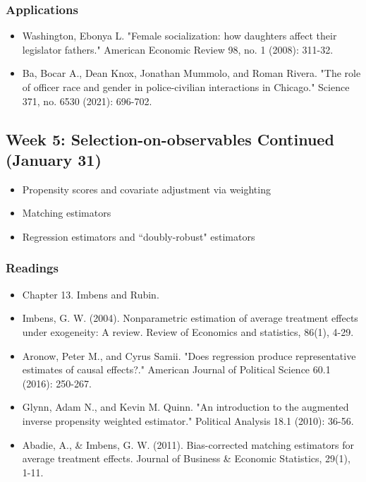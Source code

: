\documentclass[11pt, article, oneside]{memoir}
\theoremstyle{Assumption}
\begin{document}
\subsubsection*{Applications}

\begin{itemize}
\item Washington, Ebonya L. "Female socialization: how daughters affect their legislator fathers." American Economic Review 98, no. 1 (2008): 311-32.
\item Ba, Bocar A., Dean Knox, Jonathan Mummolo, and Roman Rivera. "The role of officer race and gender in police-civilian interactions in Chicago." Science 371, no. 6530 (2021): 696-702.
\end{itemize}

\subsection{Week 5: Selection-on-observables Continued (January 31)}

\begin{itemize}
\item Propensity scores and covariate adjustment via weighting 
\item Matching estimators
\item Regression estimators and ``doubly-robust" estimators
\end{itemize}


\subsubsection*{Readings}

\begin{itemize}
\item Chapter 13. Imbens and Rubin. 
\item Imbens, G. W. (2004). Nonparametric estimation of average treatment effects under exogeneity: A review. Review of Economics and statistics, 86(1), 4-29.
\item Aronow, Peter M., and Cyrus Samii. "Does regression produce representative estimates of causal effects?." American Journal of Political Science 60.1 (2016): 250-267.
\item Glynn, Adam N., and Kevin M. Quinn. "An introduction to the augmented inverse propensity weighted estimator." Political Analysis 18.1 (2010): 36-56.
\item Abadie, A., \& Imbens, G. W. (2011). Bias-corrected matching estimators for average treatment effects. Journal of Business \& Economic Statistics, 29(1), 1-11.
\end{itemize}
\end{document}
